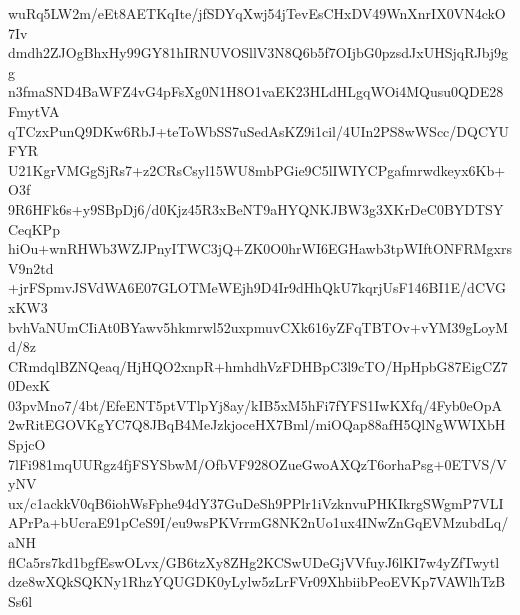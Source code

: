 wuRq5LW2m/eEt8AETKqIte/jfSDYqXwj54jTevEsCHxDV49WnXnrIX0VN4ckO7Iv
dmdh2ZJOgBhxHy99GY81hIRNUVOSllV3N8Q6b5f7OIjbG0pzsdJxUHSjqRJbj9gg
n3fmaSND4BaWFZ4vG4pFsXg0N1H8O1vaEK23HLdHLgqWOi4MQusu0QDE28FmytVA
qTCzxPunQ9DKw6RbJ+teToWbSS7uSedAsKZ9i1cil/4UIn2PS8wWScc/DQCYUFYR
U21KgrVMGgSjRs7+z2CRsCsyl15WU8mbPGie9C5lIWIYCPgafmrwdkeyx6Kb+O3f
9R6HFk6s+y9SBpDj6/d0Kjz45R3xBeNT9aHYQNKJBW3g3XKrDeC0BYDTSYCeqKPp
hiOu+wnRHWb3WZJPnyITWC3jQ+ZK0O0hrWI6EGHawb3tpWIftONFRMgxrsV9n2td
+jrFSpmvJSVdWA6E07GLOTMeWEjh9D4Ir9dHhQkU7kqrjUsF146BI1E/dCVGxKW3
bvhVaNUmCIiAt0BYawv5hkmrwl52uxpmuvCXk616yZFqTBTOv+vYM39gLoyMd/8z
CRmdqlBZNQeaq/HjHQO2xnpR+hmhdhVzFDHBpC3l9cTO/HpHpbG87EigCZ70DexK
03pvMno7/4bt/EfeENT5ptVTlpYj8ay/kIB5xM5hFi7fYFS1IwKXfq/4Fyb0eOpA
2wRitEGOVKgYC7Q8JBqB4MeJzkjoceHX7Bml/miOQap88afH5QlNgWWIXbHSpjcO
7lFi981mqUURgz4fjFSYSbwM/OfbVF928OZueGwoAXQzT6orhaPsg+0ETVS/VyNV
ux/c1ackkV0qB6iohWsFphe94dY37GuDeSh9PPlr1iVzknvuPHKIkrgSWgmP7VLI
APrPa+bUcraE91pCeS9I/eu9wsPKVrrmG8NK2nUo1ux4INwZnGqEVMzubdLq/aNH
flCa5rs7kd1bgfEswOLvx/GB6tzXy8ZHg2KCSwUDeGjVVfuyJ6lKI7w4yZfTwytl
dze8wXQkSQKNy1RhzYQUGDK0yLylw5zLrFVr09XhbiibPeoEVKp7VAWlhTzBSs6l

